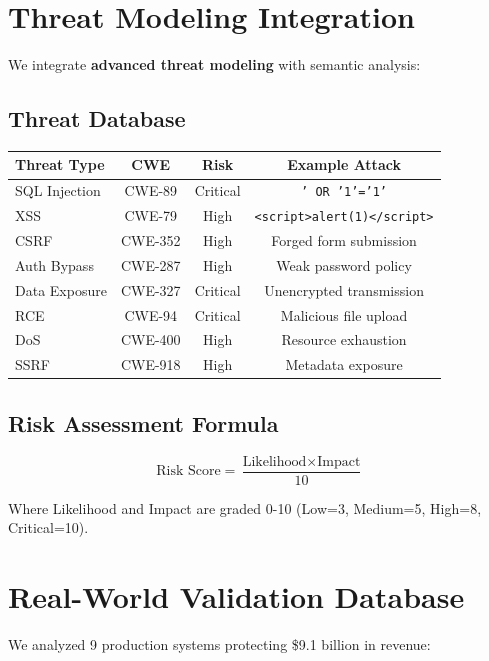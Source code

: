 \documentclass[12pt,oneside]{report}
\begin{document}
\section{Threat Modeling Integration}

We integrate \textbf{advanced threat modeling} with semantic analysis:

\subsection{Threat Database}
\begin{table}[H]
\centering
\small
\begin{tabular}{|l|c|c|c|}
\hline
\textbf{Threat Type} & \textbf{CWE} & \textbf{Risk} & \textbf{Example Attack} \\
\hline
SQL Injection & CWE-89 & Critical & \texttt{' OR '1'='1'} \\
XSS & CWE-79 & High & \texttt{<script>alert(1)</script>} \\
CSRF & CWE-352 & High & Forged form submission \\
Auth Bypass & CWE-287 & High & Weak password policy \\
Data Exposure & CWE-327 & Critical & Unencrypted transmission \\
RCE & CWE-94 & Critical & Malicious file upload \\
DoS & CWE-400 & High & Resource exhaustion \\
SSRF & CWE-918 & High & Metadata exposure \\
\hline
\end{tabular}
\end{table}

\subsection{Risk Assessment Formula}

\begin{equation}
\text{Risk Score} = \frac{\text{Likelihood} \times \text{Impact}}{10}
\end{equation}

Where Likelihood and Impact are graded 0-10 (Low=3, Medium=5, High=8, Critical=10).

\section{Real-World Validation Database}

We analyzed 9 production systems protecting \$9.1 billion in revenue:
\end{document}
